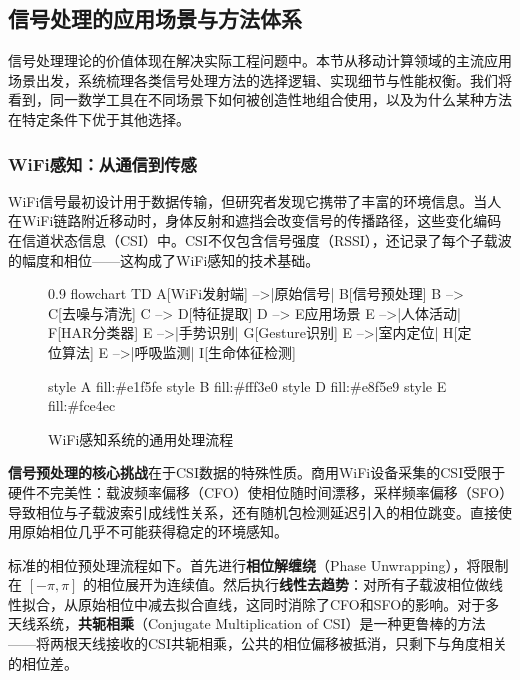 \subsection{信号处理的应用场景与方法体系}

信号处理理论的价值体现在解决实际工程问题中。本节从移动计算领域的主流应用场景出发，系统梳理各类信号处理方法的选择逻辑、实现细节与性能权衡。我们将看到，同一数学工具在不同场景下如何被创造性地组合使用，以及为什么某种方法在特定条件下优于其他选择。

\subsubsection{WiFi感知：从通信到传感}

WiFi信号最初设计用于数据传输，但研究者发现它携带了丰富的环境信息。当人在WiFi链路附近移动时，身体反射和遮挡会改变信号的传播路径，这些变化编码在信道状态信息（CSI）中。CSI不仅包含信号强度（RSSI），还记录了每个子载波的幅度和相位——这构成了WiFi感知的技术基础。

\begin{figure}[htbp]
    \centering
    \begin{mmd}{0.9\textwidth}
flowchart TD
    A[WiFi发射端] -->|原始信号| B[信号预处理]
    B --> C[去噪与清洗]
    C --> D[特征提取]
    D --> E{应用场景}
    E -->|人体活动| F[HAR分类器]
    E -->|手势识别| G[Gesture识别]
    E -->|室内定位| H[定位算法]
    E -->|呼吸监测| I[生命体征检测]
    
    style A fill:#e1f5fe
    style B fill:#fff3e0
    style D fill:#e8f5e9
    style E fill:#fce4ec
    \end{mmd}
    \caption{WiFi感知系统的通用处理流程}
    \label{fig:wifi-sensing-pipeline}
\end{figure}

\textbf{信号预处理的核心挑战}在于CSI数据的特殊性质。商用WiFi设备采集的CSI受限于硬件不完美性：载波频率偏移（CFO）使相位随时间漂移，采样频率偏移（SFO）导致相位与子载波索引成线性关系，还有随机包检测延迟引入的相位跳变。直接使用原始相位几乎不可能获得稳定的环境感知。

标准的相位预处理流程如下。首先进行\textbf{相位解缠绕}（Phase Unwrapping），将限制在 $[-\pi, \pi]$ 的相位展开为连续值。然后执行\textbf{线性去趋势}：对所有子载波相位做线性拟合，从原始相位中减去拟合直线，这同时消除了CFO和SFO的影响。对于多天线系统，\textbf{共轭相乘}（Conjugate Multiplication of CSI）是一种更鲁棒的方法——将两根天线接收的CSI共轭相乘，公共的相位偏移被抵消，只剩下与角度相关的相位差。

